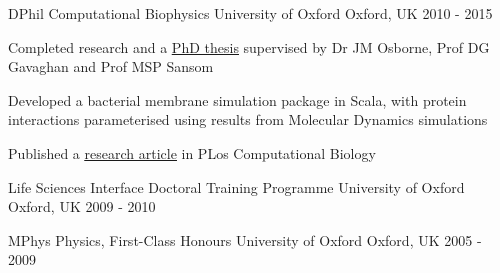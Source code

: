 

\begin{cventries}

  \cventry
    {DPhil Computational Biophysics} %
    {University of Oxford} %
    {Oxford, UK} %
    {2010 - 2015} %
    {
      \begin{cvitems} %
        \item {Completed research and a \href{https://ora.ox.ac.uk/objects/uuid:893568e9-696f-47e7-8495-59ecfb810459}{\underline{PhD thesis}} supervised by Dr JM Osborne, Prof DG Gavaghan and Prof MSP Sansom}
        \item {Developed a bacterial membrane simulation package in Scala, with protein interactions parameterised using results from Molecular Dynamics simulations}
        \item {Published a \href{https://doi.org/10.1371/journal.pcbi.1003417}{\underline{research article}} in PLos Computational Biology}
      \end{cvitems}
    }

  \cventry
    {Life Sciences Interface Doctoral Training Programme} %
    {University of Oxford} %
    {Oxford, UK} %
    {2009 - 2010} %
    {
    }

  \cventry
    {MPhys Physics, First-Class Honours} %
    {University of Oxford} %
    {Oxford, UK} %
    {2005 - 2009} %
    {
    }

\end{cventries}